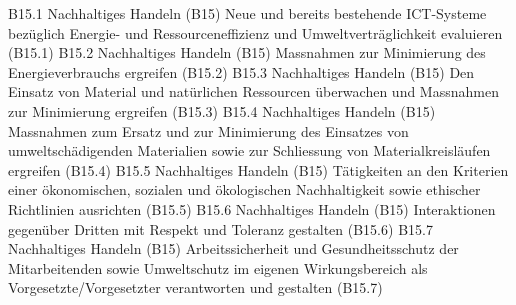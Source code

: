 \templateCard
  {B15.1}
  {Nachhaltiges Handeln (B15)}
  {Neue und bereits bestehende ICT-Systeme bezüglich Energie- und Ressourceneffizienz und Umweltverträglichkeit evaluieren (B15.1)}
\templateCard
  {B15.2}
  {Nachhaltiges Handeln (B15)}
  {Massnahmen zur Minimierung des Energieverbrauchs ergreifen (B15.2)}
\templateCard
  {B15.3}
  {Nachhaltiges Handeln (B15)}
  {Den Einsatz von Material und natürlichen Ressourcen überwachen und Massnahmen zur Minimierung ergreifen (B15.3)}
\templateCard
  {B15.4}
  {Nachhaltiges Handeln (B15)}
  {Massnahmen zum Ersatz und zur Minimierung des Einsatzes von umweltschädigenden Materialien sowie zur Schliessung von Materialkreisläufen ergreifen (B15.4)}
\templateCard
  {B15.5}
  {Nachhaltiges Handeln (B15)}
  {Tätigkeiten an den Kriterien einer ökonomischen, sozialen und ökologischen Nachhaltigkeit sowie ethischer Richtlinien ausrichten (B15.5)}
\templateCard
  {B15.6}
  {Nachhaltiges Handeln (B15)}
  {Interaktionen gegenüber Dritten mit Respekt und Toleranz gestalten (B15.6)}
\templateCard
  {B15.7}
  {Nachhaltiges Handeln (B15)}
  {Arbeitssicherheit und Gesundheitsschutz der Mitarbeitenden sowie Umweltschutz im eigenen Wirkungsbereich als Vorgesetzte/Vorgesetzter verantworten und gestalten (B15.7)}
